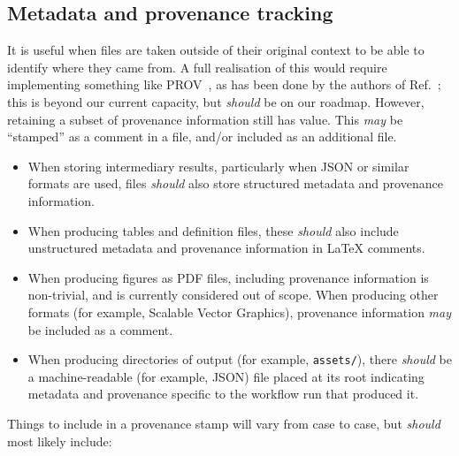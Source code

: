 \documentclass{article}
\newcommand\rfcword[1]{\emph{#1}\xspace}
\newcommand\should{\rfcword{should}}
\newcommand\may{\rfcword{may}}
\newcommand\filename[1]{\texttt{#1}\xspace}
\begin{document}
\subsection{Metadata and provenance tracking}

It is useful
when files are taken outside of their original context
to be able to identify where they came from.
A full realisation of this would require implementing something like PROV~\cite{prov},
as has been done by the authors of Ref.~\cite{Auge:2023vnd};
this is beyond our current capacity,
but \should be on our roadmap.
However,
retaining a subset of provenance information still has value.
This \may be ``stamped'' as a comment in a file,
and/or included as an additional file.

\begin{itemize}
  \item
        When storing intermediary results,
        particularly when JSON or similar formats are used,
        files \should also store structured metadata and provenance information.
  \item
        When producing tables and definition files,
        these \should also include
        unstructured metadata and provenance information
        in LaTeX comments.
  \item
        When producing figures as PDF files,
        including provenance information is non-trivial,
        and is currently considered out of scope.
        When producing other formats
        (for example, Scalable Vector Graphics),
        provenance information \may be included as a comment.
  \item
        When producing directories of output
        (for example, \filename{assets/}),
        there \should be a machine-readable
        (for example, JSON)
        file placed at its root
        indicating metadata and provenance specific to the workflow run that produced it.
\end{itemize}

Things to include in a provenance stamp will vary from case to case,
but \should most likely include:
\end{document}
